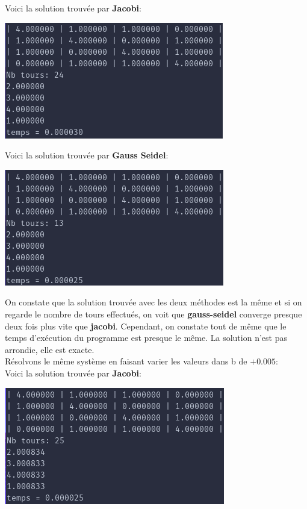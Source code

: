 \documentclass[a4paper]{article}
\begin{document}
Voici la solution trouvée par \textbf{Jacobi}:

\includegraphics[scale=0.5]{./img/jacobi/jac_ex_1.png}

Voici la solution trouvée par \textbf{Gauss Seidel}:

\includegraphics[scale=0.5]{./img/gauss_seidel/g_e_ex_1.png}

On constate que la solution trouvée avec les deux méthodes est la même et si on
regarde le nombre de tours effectués, on voit que \textbf{gauss-seidel} converge
presque deux fois plus vite que \textbf{jacobi}. Cependant, on constate tout de
même que le temps d’exécution du programme est presque le même. La solution
n'est pas arrondie, elle est exacte.\\

Résolvons le même système en faisant varier les valeurs dans b de $+0.005$:\\

Voici la solution trouvée par \textbf{Jacobi}:

\includegraphics[scale=0.5]{./img/jacobi/jac_ex_1_mod.png}
\end{document}
